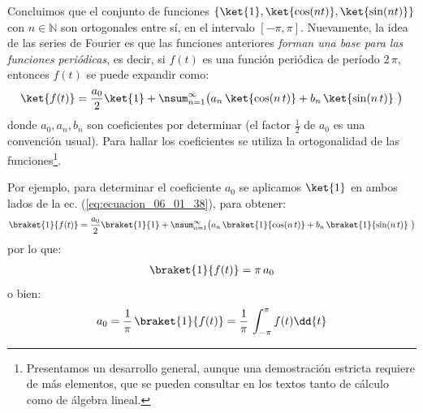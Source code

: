 Concluimos que el conjunto de funciones $\left\{ \ket{1}, \ket{\cos(nt)}, \ket{\sin(nt)} \right\}$ con $n \in \mathbb{N}$ son ortogonales entre sí, en el intervalo $[-\pi, \pi]$.
Nuevamente, la idea de las series de Fourier es que las funciones anteriores \emph{forman una base para las funciones periódicas}, es decir, si $f(t)$ es una función periódica de período $2 \, \pi$, entonces $f(t)$ se puede expandir como:
\begin{align}
\ket{f(t)} = \dfrac{a_{0}}{2} \ket{1} + \nsum_{n=1}^{\infty} \big( a_{n} \, \ket{\cos (n \, t)} + b_{n} \, \ket{\sin (n \, t)} \ \big)
\label{eq:ecuacion_06_01_38}
\end{align}
donde $a_{0}, a_{n}, b_{n}$ son coeficientes por determinar (el factor $\frac{1}{2}$ de $a_{0}$ es una convención usual). Para hallar los coeficientes se utiliza la ortogonalidad de las funciones\footnote{Presentamos un desarrollo general, aunque una demostración estricta requiere de más elementos, que se pueden consultar en los textos tanto de cálculo como de álgebra lineal.}.
\par
Por ejemplo, para determinar el coeficiente $a_{0}$ se aplicamos $\ket{1}$ en ambos lados de la ec. (\ref{eq:ecuacion_06_01_38}), para obtener:
\begin{align}
\braket{1}{f(t)} = \dfrac{a_{0}}{2} \braket{1}{1} + \nsum_{n=1}^{\infty} \big( a_{n} \, \braket{1}{\cos (n \, t)} + b_{n} \, \braket{1}{\sin (n \, t)} \ \big)
\end{align}
por lo que:
\begin{align}
\braket{1}{f(t)} = \pi \, a_{0}
\label{eq:ecuacion_06_01_40}
\end{align}
o bien:
\begin{align}
a_{0} = \dfrac{1}{\pi} \, \braket{1}{f(t)} = \dfrac{1}{\pi} \, \int_{-\pi}^{\pi} f(t) \dd{t}
\label{eq:ecuacion_06_01_41}
\end{align}

